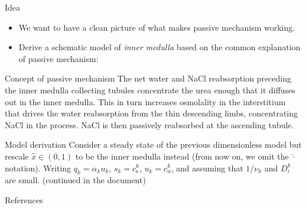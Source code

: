 \documentclass{beamer}
\begin{document}
\begin{frame}{Idea}
    \begin{itemize}
        \item We want to have a clean picture of what makes passive mechanism working.
        \item Derive a schematic model of \textit{inner medulla} based on the common explanation of passive mechanism:
    \end{itemize}
    \begin{alertblock}{Concept of passive mechanism}
        The net water and NaCl reabsorption preceding the inner medulla collecting tubules concentrate the urea enough that it diffuses out in the inner medulla.
        This in turn increases osmolality in the interstitium that drives the water reabsorption from the thin descending limbs, concentrating NaCl in the process.
        NaCl is then passively reabsorbed at the ascending tubule.
    \end{alertblock}
    
\end{frame}

\begin{frame}{Model derivation}
    Consider a steady state of the previous dimensionless model but rescale $\hat{x}\in (0,1)$ to be the inner medulla instead (from now on, we omit the $\hat{\cdot}$ notation). 
    Writing $q_k = \alpha_ku_k$, $s_k = c_\mathrm{s}^k$, $u_k = c_\mathrm{u}^k$, and assuming that $1/\nu_k$ and $D_i^k$ are small.
    (continued in the document)
\end{frame}


\begin{frame}[allowframebreaks]{References}
    
    \tiny
\end{frame}
\end{document}
